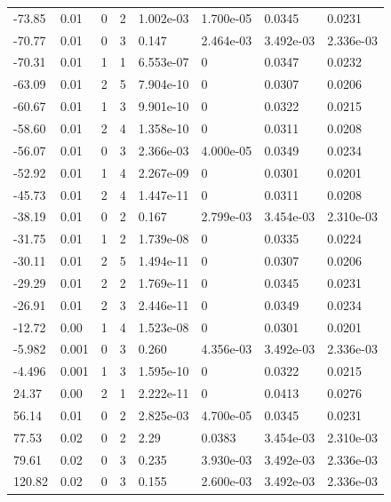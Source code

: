\documentclass[preview]{standalone}
\begin{document}
{{\begin{tabular}{L{1.2cm}C{1.2cm} C{0.3cm}C{0.5cm} C{1.4cm}C{1.4cm} C{1.4cm}C{1.4cm}}
  -73.85  &  0.01  & 0     &  2 &  1.002e-03  & 1.700e-05  & 0.0345 &  0.0231   \\ 
  -70.77  &  0.01  & 0     &  3 &  0.147  & 2.464e-03  & 3.492e-03 &  2.336e-03   \\ 
  -70.31  &  0.01  & 1     &  1 &  6.553e-07  & 0  & 0.0347 &  0.0232   \\ 
  -63.09  &  0.01  & 2     &  5 &  7.904e-10  & 0  & 0.0307 &  0.0206   \\ 
  -60.67  &  0.01  & 1     &  3 &  9.901e-10  & 0  & 0.0322 &  0.0215   \\ 
  -58.60  &  0.01  & 2     &  4 &  1.358e-10  & 0  & 0.0311 &  0.0208   \\ 
  -56.07  &  0.01  & 0     &  3 &  2.366e-03  & 4.000e-05  & 0.0349 &  0.0234   \\ 
  -52.92  &  0.01  & 1     &  4 &  2.267e-09  & 0  & 0.0301 &  0.0201   \\ 
  -45.73  &  0.01  & 2     &  4 &  1.447e-11  & 0  & 0.0311 &  0.0208   \\ 
  -38.19  &  0.01  & 0     &  2 &  0.167  & 2.799e-03  & 3.454e-03 &  2.310e-03   \\ 
  -31.75  &  0.01  & 1     &  2 &  1.739e-08  & 0  & 0.0335 &  0.0224   \\ 
  -30.11  &  0.01  & 2     &  5 &  1.494e-11  & 0  & 0.0307 &  0.0206   \\ 
  -29.29  &  0.01  & 2     &  2 &  1.769e-11  & 0  & 0.0345 &  0.0231   \\ 
  -26.91  &  0.01  & 2     &  3 &  2.446e-11  & 0  & 0.0349 &  0.0234   \\ 
  -12.72  &  0.00  & 1     &  4 &  1.523e-08  & 0  & 0.0301 &  0.0201   \\ 
  -5.982  &  0.001  & 0     &  3 &  0.260  & 4.356e-03  & 3.492e-03 &  2.336e-03   \\ 
  -4.496  &  0.001  & 1     &  3 &  1.595e-10  & 0  & 0.0322 &  0.0215   \\ 
  24.37  &  0.00  & 2     &  1 &  2.222e-11  & 0  & 0.0413 &  0.0276   \\ 
  56.14  &  0.01  & 0     &  2 &  2.825e-03  & 4.700e-05  & 0.0345 &  0.0231   \\ 
  77.53  &  0.02  & 0     &  2 &  2.29  & 0.0383  & 3.454e-03 &  2.310e-03   \\ 
  79.61  &  0.02  & 0     &  3 &  0.235  & 3.930e-03  & 3.492e-03 &  2.336e-03   \\ 
  120.82  &  0.02  & 0     &  3 &  0.155  & 2.600e-03  & 3.492e-03 &  2.336e-03   \\ 

\end{tabular}}}
\end{document}
